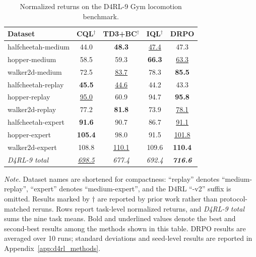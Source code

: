 \begin{table}[t]
\centering
\caption{Normalized returns on the D4RL-9 Gym locomotion benchmark.}
\label{tab:d4rl_performance}

\small
\setlength{\tabcolsep}{3.9pt}
\renewcommand{\arraystretch}{1.07}

\begin{tabular*}{\columnwidth}{@{\extracolsep{\fill}}lcccc}
\toprule
Dataset
&
CQL$^\dagger$
&
TD3+BC$^\dagger$
&
IQL$^\dagger$
&
\textbf{DRPO}
\\
\midrule

halfcheetah-medium
& 44.0 & \textbf{48.3} & \underline{47.4} & 47.3 \\
hopper-medium
& 58.5 & 59.3 & \textbf{66.3} & \underline{63.3} \\
walker2d-medium
& 72.5 & \underline{83.7} & 78.3 & \textbf{85.5} \\

\midrule

halfcheetah-replay
& \textbf{45.5} & \underline{44.6} & 44.2 & 43.3 \\
hopper-replay
& \underline{95.0} & 60.9 & 94.7 & \textbf{95.8} \\
walker2d-replay
& 77.2 & \textbf{81.8} & 73.9 & \underline{78.1} \\

\midrule

halfcheetah-expert
& \textbf{91.6} & 90.7 & 86.7 & \underline{91.1} \\
hopper-expert
& \textbf{105.4} & 98.0 & 91.5 & \underline{101.8} \\
walker2d-expert
& 108.8 & \underline{110.1} & 109.6 & \textbf{110.4} \\

\midrule

\textit{D4RL-9 total}
& \textit{\underline{698.5}}
& \textit{677.4}
& \textit{692.4}
& \textbf{\textit{716.6}}
\\

\bottomrule
\end{tabular*}

\vspace{2pt}

\begin{minipage}{\columnwidth}
\small
\textit{Note.}
Dataset names are shortened for compactness: ``replay'' denotes
``medium-replay'', ``expert'' denotes ``medium-expert'', and the D4RL
``-v2'' suffix is omitted. Results marked by $\dagger$ are reported by
prior work rather than protocol-matched reruns. Rows report task-level
normalized returns, and \textit{D4RL-9 total} sums the nine task means.
Bold and underlined values denote the best and second-best results among
the methods shown in this table. DRPO results are averaged over 10 runs;
standard deviations and seed-level results are reported in
Appendix~\ref{app:d4rl_methods}.
\end{minipage}

\end{table}

